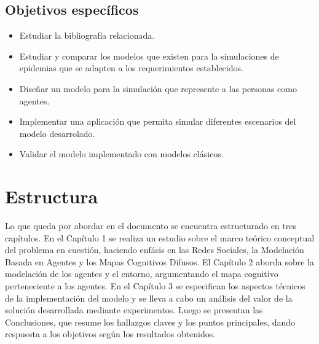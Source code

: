 \subsection{Objetivos específicos}
\begin{itemize}
    \item Estudiar la bibliografía relacionada.
    \item Estudiar y comparar los modelos que existen para la simulaciones de epidemias que se adapten a los requerimientos establecidos.
    \item Diseñar un modelo para la simulación que represente a las personas como agentes.
    \item Implementar una aplicación que permita simular diferentes escenarios del modelo desarrolado.
    \item Validar el modelo implementado con modelos clásicos.
\end{itemize}


\section{Estructura}
Lo que queda por abordar en el documento se encuentra estructurado en tres capítulos. En el Capítulo 1 
se realiza un estudio sobre el marco teórico conceptual del problema en cuestión, haciendo enfásis en 
las Redes Sociales, la Modelación Basada en Agentes y los Mapas Cognitivos Difusos. El Capítulo 2 aborda sobre
la modelación de los agentes y el entorno, argumentando el mapa cognitivo perteneciente a los agentes. En el 
Capítulo 3 se especifican los aspectos técnicos de la implementación del modelo y se lleva a cabo un 
análisis del valor de la solución desarrollada mediante experimentos. Luego se presentan las Conclusiones,
que resume los hallazgos claves y los puntos principales, dando respuesta a los objetivos según los resultados obtenidos.






